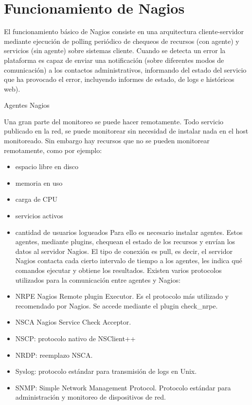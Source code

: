 \documentclass[11pt,a4paper]{article}
\begin{document}
    
\section{Funcionamiento de Nagios}


El funcionamiento básico de Nagios consiste en una arquitectura cliente-servidor mediante ejecución de polling periódico de chequeos de recursos (con agente) y servicios (sin agente) sobre sistemas cliente. Cuando se detecta un error la plataforma es capaz de enviar una notificación (sobre diferentes modos de comunicación) a los contactos administrativos, informando del estado del servicio que ha provocado el error, incluyendo informes de estado, de logs e históricos web).

Agentes Nagios

Una gran parte del monitoreo se puede hacer remotamente. Todo servicio publicado en la red, se puede monitorear sin necesidad de instalar nada en el host monitoreado. Sin embargo hay recursos que no se pueden monitorear remotamente, como por ejemplo:
\begin{itemize}

\item  espacio libre en disco
\item  memoria en uso
\item  carga de CPU
\item  servicios activos
\item  cantidad de usuarios logueados
Para ello es necesario instalar agentes. Estos agentes, mediante plugins, chequean el estado de los recursos y envían los datos al servidor Nagios. El tipo de conexión es pull, es decir, el servidor Nagios contacta cada cierto intervalo de tiempo a los agentes, les indica qué comandos ejecutar y obtiene los resultados.
Existen varios protocolos utilizados para la comunicación entre agentes y Nagios:
\item  NRPE Nagios Remote plugin Executor. Es el protocolo más utilizado y recomendado por Nagios. Se accede mediante el plugin check\_nrpe.
\item  NSCA Nagios Service Check Acceptor.
\item  NSCP: protocolo nativo de NSClient++
\item  NRDP: reemplazo NSCA.
\item  Syslog: protocolo estándar para transmisión de logs en Unix.
\item  SNMP: Simple Network Management Protocol. Protocolo estándar para administración y monitoreo de dispositivos de red.


\end{itemize}
\end{document}
